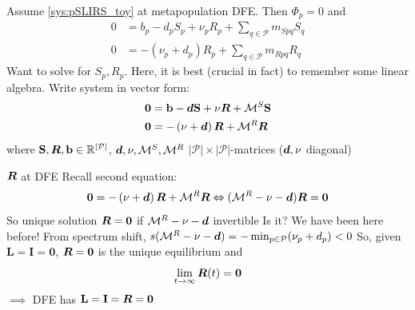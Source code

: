 \documentclass[aspectratio=169]{beamer}\usepackage[]{graphicx}\usepackage[]{xcolor}
\begin{document}

\begin{frame}{}
Assume \eqref{sys:pSLIRS_toy} at metapopulation DFE. Then $\Phi_p=0$ and 
\begin{align*}
0 &=b_p-d_pS_p+\nu_pR_p
+\textstyle{\sum_{q\in\mathcal{P}}} m_{Spq}S_{q} \\
0 &=-\left(\nu_{p}+d_{p}\right)R_{p}
+\textstyle{\sum_{q\in\mathcal{P}}} m_{Rpq}R_{q}
\end{align*}
Want to solve for $S_p,R_p$. Here, it is best (crucial in fact) to remember some linear algebra. Write system in vector form:
\begin{align*}
\mathbf{0} &=\mathbf{b}-\bm{d}\mathbf{S}+\mathbf{\nu}\bm{R}+\mathcal{M}^S\mathbf{S} \\
\mathbf{0} &=-\left(\mathbf{\nu}+\bm{d}\right)\bm{R}+\mathcal{M}^R\bm{R}
\end{align*}
where $\mathbf{S},\bm{R},\mathbf{b}\in\mathbb{R}^{|\mathcal{P}|}$, $\bm{d},\mathbf{\nu},\mathcal{M}^S,\mathcal{M}^R$ $|\mathcal{P}|\times|\mathcal{P}|$-matrices ($\bm{d},\mathbf{\nu}$ diagonal)
\end{frame}

\begin{frame}{$\bm{R}$ at DFE}
Recall second equation:
$$
\mathbf{0} =-\left(\mathbf{\nu}+\bm{d}\right)\bm{R}+\mathcal{M}^R\bm{R} \Leftrightarrow (\mathcal{M}^R-\mathbf{\nu}-\bm{d})\bm{R}=\mathbf{0}
$$
\vfill
So unique solution $\bm{R}=\mathbf{0}$ if $\mathcal{M}^R-\mathbf{\nu}-\bm{d}$ invertible
Is it?
\vfill
We have been here before! 
\vfill
From spectrum shift, $s(\mathcal{M}^R-\mathbf{\nu}-\bm{d})=-\min_{p\in\mathcal{P}}(\nu_p+d_p)<0$
\vfill
So, given $\mathbf{L}=\mathbf{I}=\mathbf{0}$, $\bm{R}=\mathbf{0}$ is the unique equilibrium and
$$
\lim_{t\to\infty}\bm{R}(t)=\mathbf{0}
$$
\vfill
$\implies$ DFE has $\mathbf{L}=\mathbf{I}=\bm{R}=\mathbf{0}$
\end{frame}
\end{document}
